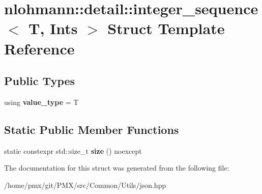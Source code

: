 \hypertarget{structnlohmann_1_1detail_1_1integer__sequence}{}\section{nlohmann\+:\+:detail\+:\+:integer\+\_\+sequence$<$ T, Ints $>$ Struct Template Reference}
\label{structnlohmann_1_1detail_1_1integer__sequence}
\subsection*{Public Types}
\begin{DoxyCompactItemize}
\item 
\mbox{\label{structnlohmann_1_1detail_1_1integer__sequence_a0220e7e5f85f91c6b7a930e469cda5c5}} 
using {\bfseries value\+\_\+type} = T
\end{DoxyCompactItemize}
\subsection*{Static Public Member Functions}
\begin{DoxyCompactItemize}
\item 
\mbox{\label{structnlohmann_1_1detail_1_1integer__sequence_a6024bae596d01193397a7396af3aa19a}} 
static constexpr std\+::size\+\_\+t {\bfseries size} () noexcept
\end{DoxyCompactItemize}


The documentation for this struct was generated from the following file\+:\begin{DoxyCompactItemize}
\item 
/home/pmx/git/\+P\+M\+X/src/\+Common/\+Utils/json.\+hpp\end{DoxyCompactItemize}
